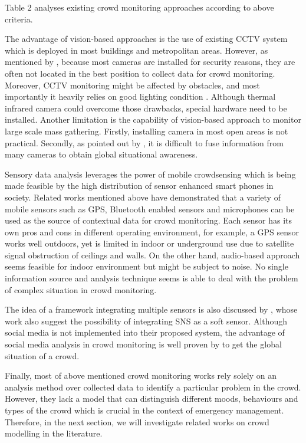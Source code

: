 Table 2 analyses existing crowd monitoring approaches according to above criteria.

The advantage of vision-based approaches is the use of existing CCTV system which is deployed in most buildings and metropolitan areas. However, as mentioned by \citet{Davies1995}, because most cameras are installed for security reasons, they are often not located in the best position to collect data for crowd monitoring. Moreover, CCTV monitoring might be affected by obstacles, and most importantly it heavily relies on good lighting condition \citep{Wirz2012}. Although thermal infrared camera could overcome those drawbacks, special hardware need to be installed. Another limitation is the capability of vision-based approach to monitor large scale mass gathering. Firstly, installing camera in most open areas is not practical. Secondly, as pointed out by \citet{Wirz2012}, it is difficult to fuse information from many cameras to obtain global situational awareness.

Sensory data analysis leverages the power of mobile crowdsensing which is being made feasible by the high distribution of sensor enhanced smart phones in society. Related works mentioned above have demonstrated that a variety of mobile sensors such as GPS, Bluetooth enabled sensors and microphones can be used as the source of contextual data for crowd monitoring. Each sensor has its own pros and cons in different operating environment, for example, a GPS sensor works well outdoors, yet is limited in indoor or underground use due to satellite signal obstruction of ceilings and walls. On the other hand, audio-based approach seems feasible for indoor environment but might be subject to noise. No single information source and analysis technique seems is able to deal with the problem of complex situation in crowd monitoring.

The idea of a framework integrating multiple sensors is also discussed by \citet{Ramesh2014}, whose work also suggest the possibility of integrating SNS as a soft sensor. Although social media is not implemented into their proposed system, the advantage of social media analysis in crowd monitoring is well proven by \citet{DelirHaghighi2013} to get the global situation of a crowd.

Finally, most of above mentioned crowd monitoring works rely solely on an analysis method over collected data to identify a particular problem in the crowd. However, they lack a model that can distinguish different moods, behaviours and types of the crowd which is crucial in the context of emergency management. Therefore, in the next section, we will investigate related works on crowd modelling in the literature.

